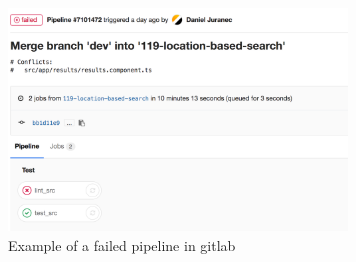 \begin{figure}
\begin{center}
\includegraphics[width=9cm]{figures/cicd_failed_pipeline}
\end{center}
\caption{Example of a failed pipeline in gitlab}
\label{fig:cicd_failed_pipeline}
\end{figure}